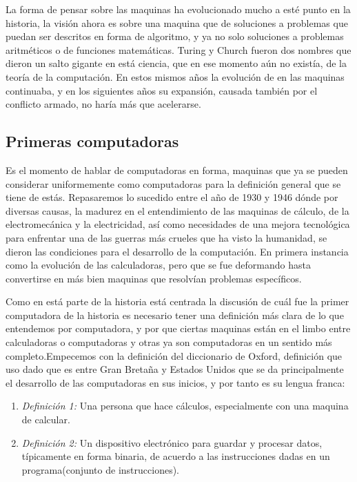 \documentclass[letterpaper,12pt,oneside]{book}
\begin{document}
		La forma de pensar sobre las maquinas ha evolucionado mucho a esté punto en la historia, la visión ahora es sobre una maquina que de soluciones a problemas que
		puedan ser descritos en forma de algoritmo, y ya no solo soluciones a problemas aritméticos o de funciones matemáticas. Turing y Church
		fueron dos nombres que dieron un salto gigante en está ciencia, que en ese momento aún no existía, de la teoría de la computación. En estos mismos años la evolución
		de en las maquinas continuaba, y en los siguientes años su expansión, causada también por el conflicto armado, no haría más que acelerarse.
		
		\clearpage		
		
		\subsection{Primeras computadoras}
		
		Es el momento de hablar de computadoras en forma, maquinas que ya se pueden considerar uniformemente como computadoras para la definición general
		que se tiene de estás. Repasaremos lo sucedido entre el año de 1930 y 1946 dónde por diversas causas, la madurez en el entendimiento de las
		maquinas de cálculo, de la electromecánica y la electricidad, así como necesidades de una mejora tecnológica para enfrentar una de las guerras
		más crueles que ha visto la humanidad, se dieron las condiciones para el desarrollo de la computación. En primera instancia
		como la evolución de las calculadoras, pero que se fue deformando hasta convertirse en más bien maquinas que resolvían problemas específicos.
		
		Como en está parte de la historia está centrada la discusión de cuál fue la primer computadora de la historia es necesario tener una definición
		más clara de lo que entendemos por computadora, y por que ciertas maquinas están en el limbo entre calculadoras o computadoras y otras
		ya son computadoras en un sentido más completo.Empecemos con la definición 
		del diccionario de Oxford, definición que uso dado que es entre Gran Bretaña y Estados Unidos que se da principalmente el desarrollo de las computadoras
		en sus inicios, y por tanto es su lengua franca:
		\begin{enumerate}
			  \item[] \emph{ Definición 1:} Una persona que hace cálculos, especialmente con una maquina de calcular.
			  \item[] \emph{ Definición 2:} Un dispositivo electrónico para guardar y procesar datos, típicamente en forma binaria, de acuerdo a las instrucciones
			  dadas en un programa(conjunto de instrucciones).
		\end{enumerate}
		
\end{document}
